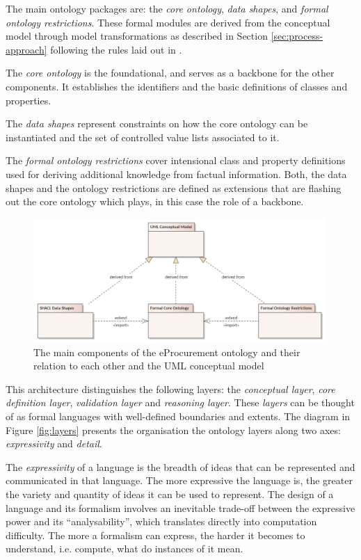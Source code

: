 	The main ontology packages are: the \textit{core ontology}, \textit{data shapes}, and \textit{formal ontology restrictions}. These formal modules are derived from the conceptual model through model transformations as described in Section \ref{sec:process-approach} following the rules laid out in \citet{costetchi2020c}.
	
	The \textit{core ontology} is the foundational, and serves as a backbone for the other components. It establishes the identifiers and the basic definitions of classes and properties.
	 	
	The \textit{data shapes} represent constraints on how the core ontology can be instantiated and the set of controlled value lists associated to it. 	
	
	The \textit{formal ontology restrictions} cover intensional class and property definitions used for deriving additional knowledge from factual information. Both, the data shapes and the ontology restrictions are defined as extensions that are flashing out the core ontology which plays, in this case the role of a backbone.
	
	\begin{figure}[!ht]
		\centering
		\includegraphics[width=0.99\textwidth]{../img/uml.png}
		\caption{The main components of the eProcurement ontology and their relation to each other and the UML conceptual model}
		\label{fig:components}
	\end{figure}
	
	This architecture distinguishes the following layers: the \textit{conceptual layer}, \textit{core definition layer}, \textit{validation layer} and \textit{reasoning layer}. These \textit{layers} can be thought of as formal languages with well-defined boundaries and extents. The diagram in Figure \ref{fig:layers} presents the organisation the ontology layers along two axes: \textit{expressivity} and \textit{detail}. 
	
	The \textit{expressivity} of a language is the breadth of ideas that can be represented and communicated in that language. The more expressive the language is, the greater the variety and quantity of ideas it can be used to represent. The design of a language and its formalism involves an inevitable trade-off between the expressive power and its ``analysability'', which translates directly into computation difficulty. The more a formalism can express, the harder it becomes to understand, i.e. compute, what do instances of it mean.
	
